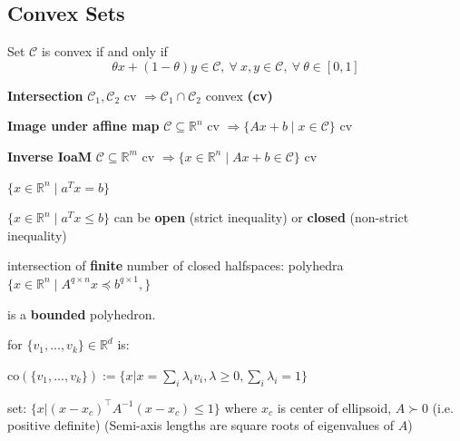 \subsection{Convex Sets}

\begin{definition}
  Set $\mathcal{C}$ is convex if and only if
  \[\theta x + (1-\theta)y \in \mathcal{C},
    \ \forall\ x,y \in \mathcal{C},
  \ \forall\ \theta \in [0,1]\]
\end{definition}

\textbf{Intersection}
$\mathcal{C}_1, \mathcal{C}_2$ cv
$\Rightarrow \mathcal{C}_1 \cap \mathcal{C}_2$ convex \textbf{(cv)}

\textbf{Image under affine map}
$\mathcal{C} \subseteq  \mathbb{R}^{n}$ cv
$\Rightarrow \{Ax+b \mid x \in \mathcal{C} \}$ cv

\textbf{Inverse IoaM}
$\mathcal{C} \subseteq  \mathbb{R}^{m}$ cv
$\Rightarrow \{x\in\mathbb{R}^{n} \mid  Ax+b\in\mathcal{C}\}$ cv

\begin{definition}[Hyperplanes]
  $\{x \in \mathbb{R}^n \mid a^T x=b\}$
\end{definition}
\begin{definition}[Halfspaces]
  $\{x \in \mathbb{R}^n \mid a^T x\le b\}$
  can be \textbf{open} (strict inequality)
  or \textbf{closed} (non-strict inequality)
\end{definition}

\begin{definition}[Polyhedra] intersection of
  \textbf{finite} number of closed halfspaces:
  polyhedra $\{x\in\mathbb{R}^n\mid A^{q\times n}x\preceq b^{q\times1},
  \}$
\end{definition}

\begin{definition}[Polytope]
  is a \textbf{bounded} polyhedron.
\end{definition}

\begin{definition}
  for  $\{v_1,...,v_k\}\in \mathbb{R}^{d}$ is:

  co$(\{v_1,...,v_k\}):=
  \{ x|x=\sum_{i}\lambda_iv_i,
  \lambda\ge0, \sum_{i}\lambda_i=1 \}$
\end{definition}

\begin{definition}[Ellipsoid]
  set:
  $\{ x | (x\!-\!x_c)^\top A^{-1}(x\!-\!x_c) \leq 1 \}$
  where $x_c$ is center of ellipsoid,
  $A \succ 0$ (i.e. positive definite)
  (Semi-axis lengths are square roots of eigenvalues of $A$)
\end{definition}

